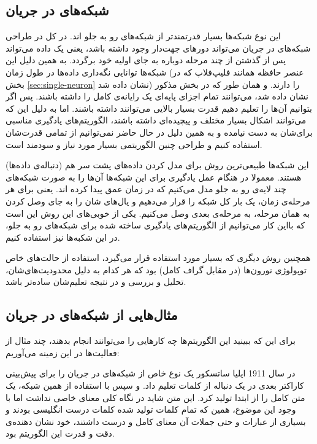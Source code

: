 \documentclass[11pt,a4paper,twocolumn]{article}
\begin{document}
\subsection{شبکه‌های در جریان}
\label{sec:recurrent}
این نوع شبکه‌ها بسیار قدرتمندتر از شبکه‌های رو به جلو اند. در کل در طراحی
شبکه‌های در جریان
می‌تواند دور‌های جهت‌دار وجود داشته باشد، یعنی یک داده می‌تواند پس از گذشتن از چند مرحله دوباره به جای اولیه خود برگردد. به همین دلیل این شبکه‌ها توانایی نگه‌داری داده‌ها در طول زمان (عنصر حافظه همانند فلیپ‌فلاپ که در بخش
\ref{sec:single-neuron}
نشان داده شد) را دارند. و همان طور که در بخش مذکور نشان داده شد، می‌توانند تمام اجزای پایه‌ای یک رایانه‌ی کامل را داشته باشند. پس اگر بتوانیم آن‌ها را تعلیم دهیم قدرت بسیار بالایی می‌توانند داشته باشند. اما به دلیل این که می‌توانند اشکال بسیار مختلف و پیچیده‌ای داشته باشند، الگوریتم‌های یادگیری مناسبی برای‌شان به دست نیامده و به همین دلیل در حال حاضر نمی‌توانیم از تمامی قدرت‌شان استفاده کنیم و طراحی چنین الگوریتمی بسیار مورد نیاز و سودمند است.

این شبکه‌ها طبیعی‌ترین روش برای مدل کردن داده‌های پشت سر هم (دنباله‌ی داده‌ها) هستند. معمولا در هنگام عمل یادگیری برای این شبکه‌ها آن‌ها را به صورت شبکه‌های چند لایه‌ی رو به جلو مدل می‌کنیم که در زمان عمق پیدا کرده اند. یعنی برای هر مرحله‌ی زمان، یک بار کل شبکه‌ را قرار می‌دهیم و یال‌های شان را به جای وصل کردن به همان مرحله، به مرحله‌ی بعدی وصل می‌کنیم. یکی از خوبی‌های این روش این است که بااین کار می‌توانیم از الگوریتم‌های یادگیری ساخته شده برای شبکه‌های رو به جلو، در این شکبه‌ها نیز استفاده کنیم.\cite{ml-hinton}

همچنین روش دیگری که بسیار مورد استفاده قرار می‌گیرد، استفاده از حالت‌های خاص توپولوژی نورون‌ها (در مقابل گراف کامل) بود که هر کدام به دلیل محدودیت‌های‌شان، تحلیل و بررسی و در نتیجه تعلیم‌شان ساده‌تر باشد.

\subsection{مثال‌هایی از شبکه‌های در جریان}
برای این که ببینید این الگوریتم‌ها چه کارهایی را می‌توانند انجام بدهند، چند مثال از فعالیت‌ها در این زمینه می‌آوریم:

در سال 1911
ایلیا ساتسکور
یک نوع خاص از شبکه‌های در جریان را برای پیش‌بینی کاراکتر بعدی در یک دنباله از کلمات تعلیم داد. و سپس با استفاده از همین شبکه، یک متن کامل را از ابتدا تولید کرد. این متن شاید در نگاه کلی معنای خاصی نداشت اما با وجود این موضوع، همین که تمام کلمات تولید شده کلمات درست انگلیسی بودند و بسیاری از عبارات و حتی جملات آن معنای کامل و درست داشتند، خود نشان دهنده‌ی دقت و قدرت این الگوریتم بود.\cite{ml-hinton}
\end{document}
